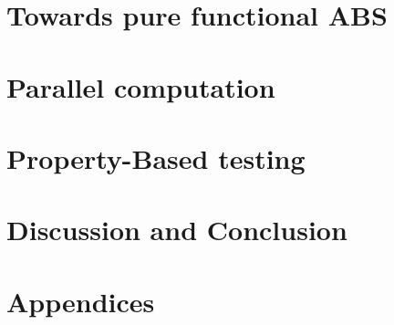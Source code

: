 \documentclass[oneside]{book}
\begin{document}




\epigraphhead[450]{}
\part{Towards pure functional ABS}






\epigraphhead[450]{}
\part{Parallel computation}


\epigraphhead[450]{}
\part{Property-Based testing}


\epigraphhead[450]{}
\part{Discussion and Conclusion}


\renewcommand\bibname{References}




\epigraphhead[450]{}
\part{Appendices}

\end{document}
